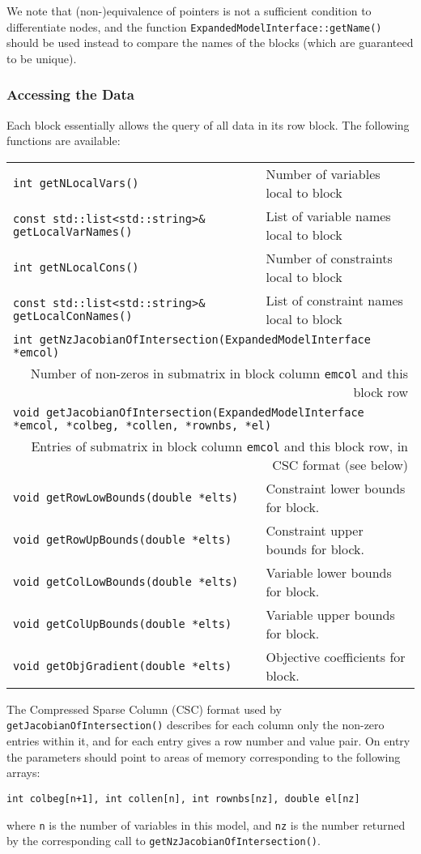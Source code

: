 \documentclass[10pt,a4paper]{report}
\begin{document}
We note that (non-)equivalence of pointers is not a sufficient condition to
differentiate nodes, and the function {\tt ExpandedModelInterface::getName()}
should be used instead to compare the names of the blocks (which are
guaranteed to be unique).

\subsubsection{Accessing the Data}
Each block essentially allows the query of all data in its row block. The
following functions are available:
\begin{center}
\begin{tabular}{ll}
{\tt int getNLocalVars()} & 
   Number of variables local to block \\
{\tt const std::list<std::string>\& getLocalVarNames()} &
   List of variable names local to block \\
{\tt int getNLocalCons()} & 
   Number of constraints local to block \\
{\tt const std::list<std::string>\& getLocalConNames()} &
   List of constraint names local to block \\
\multicolumn{2}{l}{\tt int getNzJacobianOfIntersection(ExpandedModelInterface *emcol)}\\
\multicolumn{2}{r}{Number of non-zeros in submatrix in block column {\tt emcol}
   and this block row} \\
\multicolumn{2}{l}{\tt void getJacobianOfIntersection(ExpandedModelInterface *emcol,
      *colbeg, *collen, *rownbs, *el)} \\
\multicolumn{2}{r}{Entries of submatrix in block column {\tt emcol} and this
   block row, in CSC format (see below)} \\
{\tt void getRowLowBounds(double *elts)} &
   Constraint lower bounds for block. \\
{\tt void getRowUpBounds(double *elts)} &
   Constraint upper bounds for block. \\
{\tt void getColLowBounds(double *elts)} &
   Variable lower bounds for block. \\
{\tt void getColUpBounds(double *elts)} &
   Variable upper bounds for block. \\
{\tt void getObjGradient(double *elts)} &
   Objective coefficients for block.
\end{tabular}
\end{center}

The Compressed Sparse Column (CSC) format used by 
{\tt getJacobianOfIntersection()} describes for each column only the non-zero
entries within it, and for each entry gives a row number and value pair. On
entry the parameters should point to areas of memory corresponding to the
following arrays: 
\begin{center}
{\tt int colbeg[n+1], int collen[n], int rownbs[nz], double el[nz]}
\end{center}
 where {\tt n} is the number of variables in this model, and
{\tt nz} is the number returned by the corresponding call to
{\tt getNzJacobianOfIntersection()}.
\end{document}
